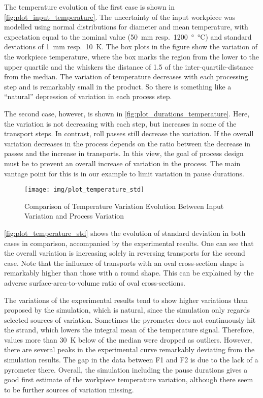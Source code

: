 The temperature evolution of the first case is shown in \autoref{fig:plot_input_temperature}.
The uncertainty of the input workpiece was modelled using normal distributions for diameter and mean temperature, with expectation equal to the nominal value (\qty{50}{\milli\meter} resp.~\qty{1200}{\degree\celsius}) and standard deviations of \qty{1}{\milli\meter} resp.~\qty{10}{\kelvin}.
The box plots in the figure show the variation of the workpiece temperature, where the box marks the region from the lower to the upper quartile and the whiskers the distance of \num{1.5} of the inter-quartile-distance from the median.
The variation of temperature decreases with each processing step and is remarkably small in the product.
So there is something like a ``natural'' depression of variation in each process step.

The second case, however, is shown in \autoref{fig:plot_durations_temperature}.
Here, the variation is not decreasing with each step, but increases in some of the transport steps.
In contrast, roll passes still decrease the variation.
If the overall variation decreases in the process depends on the ratio between the decrease in passes and the increase in transports.
In this view, the goal of process design must be to prevent an overall increase of variation in the process.
The main vantage point for this is in our example to limit variation in pause durations.

\begin{figure}
    \centering
    \texttt{[image: img/plot\_temperature\_std]}
    \caption{Comparison of Temperature Variation Evolution Between Input Variation and Process Variation}
    \label{fig:plot_temperature_std}
\end{figure}

\autoref{fig:plot_temperature_std} shows the evolution of standard deviation in both cases in comparison, accompanied by the experimental results.
One can see that the overall variation is increasing solely in reversing transports for the second case.
Note that the influence of transports with an oval cross-section shape is remarkably higher than those with a round shape.
This can be explained by the adverse surface-area-to-volume ratio of oval cross-sections.

The variations of the experimental results tend to show higher variations than proposed by the simulation, which is natural, since the simulation only regards selected sources of variation.
Sometimes the pyrometer does not continuously hit the strand, which lowers the integral mean of the temperature signal.
Therefore, values more than \qty{30}{\kelvin} below of the median were dropped as outliers.
However, there are several peaks in the experimental curve remarkably deviating from the simulation results.
The gap in the data between F1 and F2 is due to the lack of a pyrometer there.
Overall, the simulation including the pause durations gives a good first estimate of the workpiece temperature variation, although there seem to be further sources of variation missing.

